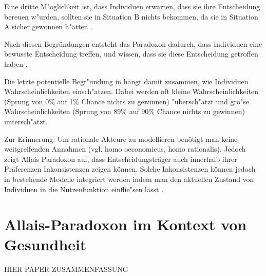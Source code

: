 \documentclass[11pt]{article}
\begin{document}
   Eine dritte M"oglichkeit ist, dass Individuen erwarten, dass sie ihre Entscheidung bereuen w"urden, sollten sie in Situation B nichts bekommen, da sie in Situation A sicher gewonnen h"atten \parencite[Bell, 1982; Loomes und Sugden, 1982; 1987a;b, in ][S. 3]{oliver2003quantitative}.
   
   Nach diesen Begr\"undungen entsteht das Paradoxon dadurch, dass Individuen eine bewusste Entscheidung treffen, und wissen, dass sie diese Entscheidung getroffen haben \parencite[vgl.][S. 17]{gintis2009bounds}. 
 
   Die letzte potentielle Begr"undung in \textcite[S. 4]{oliver2003quantitative} h\"angt damit zusammen, wie Individuen Wahrscheinlichkeiten einsch"atzen. Dabei werden oft kleine Wahrscheinlichkeiten (Sprung von 0\% auf 1\% Chance nichts zu gewinnen) "ubersch"atzt und gro"se Wahrscheinlichkeiten (Sprung von 89\% auf 90\% Chance nichts zu gewinnen) untersch"atzt.

  
   Zur Erinnerung: Um rationale Akteure zu modellieren ben\"otigt man keine weitgreifenden Annahmen (vgl. homo oeconomicus, homo rationalis). Jedoch zeigt Allais Paradoxon auf, dass Entscheidungstr\"ager auch innerhalb ihrer Pr\"aferenzen Inkonsistenzen zeigen k\"onnen. Solche Inkonsistenzen k\"onnen jedoch in bestehende Modelle integriert werden indem man den aktuellen Zustand von Individuen in die Nutzenfunktion einflie"sen l\"asst \parencite[siehe Kahnemans Prospect Theory in][S. 246]{gintis2009bounds}. 
   
   
\section{Allais-Paradoxon im Kontext von Gesundheit}
\label{sec:allais-paradoxon-im}

HIER PAPER ZUSAMMENFASSUNG



\printbibliography
\end{document}
